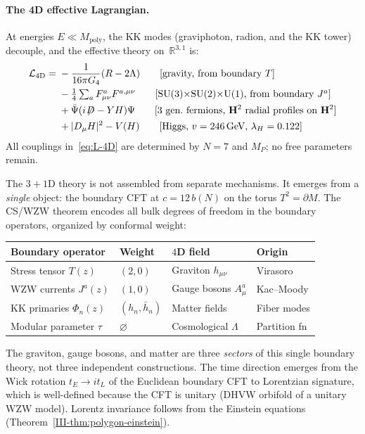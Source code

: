 \paragraph{The 4D effective Lagrangian.}
At energies $E \ll M_{\mathrm{poly}}$, the KK modes
(graviphoton, radion, and the KK tower) decouple,
and the effective theory on~$\mathbb{R}^{3,1}$ is:
\begin{equation}\label{eq:L-4D}
\begin{split}
  \mathcal{L}_{4\mathrm{D}} = {} &
  -\frac{1}{16\pi G_4}(R - 2\Lambda) \qquad\text{[gravity, from boundary $T$]}\\
  & -\tfrac{1}{4}\textstyle\sum_a F^a_{\mu\nu}F^{a,\mu\nu}
  \qquad\text{[$\mathrm{SU}(3){\times}\mathrm{SU}(2){\times}\mathrm{U}(1)$,
  from boundary $J^a$]}\\
  & + \bar\Psi(i\!\not\!\!D - Y H)\Psi
  \qquad\text{[3 gen.\ fermions, $\mathbf{H}^2$ radial profiles on $\mathbf{H}^2$]}\\
  & + |D_\mu H|^2 - V(H)
  \qquad\text{[Higgs, $v = 246$\,GeV, $\lambda_H = 0.122$]}
\end{split}
\end{equation}
All couplings in~\eqref{eq:L-4D} are determined by $N = 7$
and $M_P$; no free parameters remain.

\begin{remark}
\label{rmk:minisuperspace-4d}
The $3{+}1$D theory is not assembled from separate mechanisms.
It emerges from a \emph{single} object: the boundary CFT at
$c = 12\,b(N)$ on the torus $T^2 = \partial M$.
The CS/WZW theorem encodes all bulk degrees of freedom in the
boundary operators, organized by conformal weight:
\begin{center}
\small
\begin{tabular}{llll}
\toprule
Boundary operator & Weight & $4$D field & Origin \\
\midrule
Stress tensor $T(z)$ & $(2,0)$ & Graviton $h_{\mu\nu}$ & Virasoro \\
WZW currents $J^a(z)$ & $(1,0)$ & Gauge bosons $A^a_\mu$ &
  Kac--Moody \\
KK primaries $\Phi_n(z)$ & $(h_n, \bar h_n)$ &
  Matter fields & Fiber modes \\
Modular parameter $\tau$ & $\varnothing$ &
  Cosmological $\Lambda$ & Partition fn \\
\bottomrule
\end{tabular}
\end{center}
\noindent
The graviton, gauge bosons, and matter are three \emph{sectors}
of this single boundary theory, not three independent constructions.
The time direction emerges from the Wick rotation
$t_E \to it_L$ of the Euclidean boundary CFT to Lorentzian
signature, which is well-defined because the CFT is unitary
(DHVW orbifold of a unitary WZW model).
Lorentz invariance follows from the Einstein equations
(Theorem~\ref*{III-thm:polygon-einstein}).
\end{remark}


